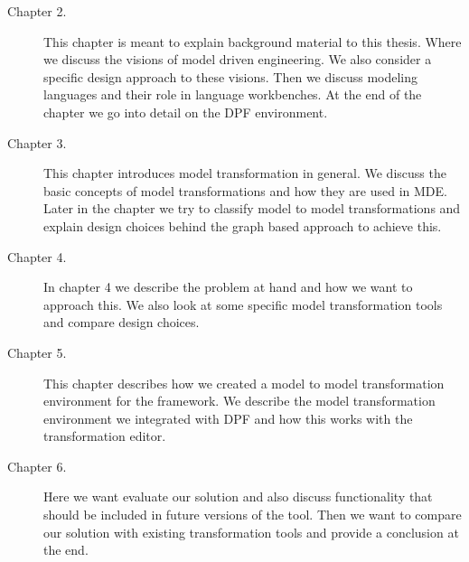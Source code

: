 \begin{description}
  \item[Chapter 2.] This chapter is meant to explain background material to this
  thesis. Where we discuss the visions of model driven engineering. We also
  consider a specific design approach to these visions. Then we discuss modeling
  languages and their role in language workbenches. At the end of the chapter we
  go into detail on the DPF environment. 
  
  \item[Chapter 3.] This chapter introduces model transformation in general. We
  discuss the basic concepts of model transformations and how they are used in
  MDE. Later in the chapter we try to classify model to model transformations
  and explain design choices behind the graph based approach to achieve this.
  
  
  \item[Chapter 4.] In chapter 4 we describe the problem at hand and how we want
  to approach this. We also look at some specific model transformation tools and
  compare design choices. 
  
  
  \item[Chapter 5.] This chapter describes how we created a model
  to model transformation environment for the framework. We describe the model
  transformation environment we integrated with DPF and how this works with the
  transformation editor. 
  
  
  \item[Chapter 6.] Here we want evaluate our solution and also discuss
  functionality that should be included in future versions of the tool. Then we
  want to compare our solution with existing transformation tools and provide a
  conclusion at the end. 
\end{description}